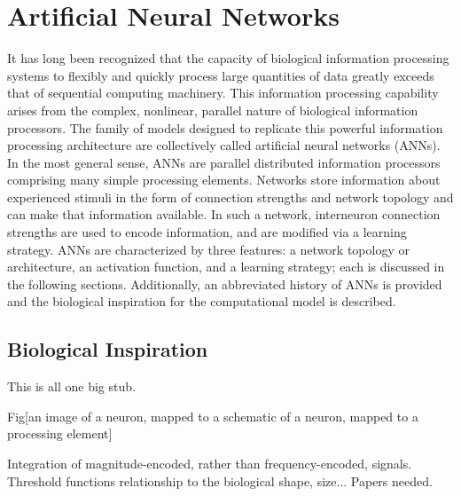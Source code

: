 \documentclass[11pt]{afthesis}
\begin{document}
	\section{Artificial Neural Networks}
	
	
	
	It has long been recognized that the capacity of biological information processing systems to flexibly and quickly process large quantities of data greatly exceeds that of sequential computing machinery. This information processing capability arises from the complex, nonlinear, parallel nature of biological information processors. The family of models designed to replicate this powerful information processing architecture are collectively called artificial neural networks (ANNs). In the most general sense, ANNs are parallel distributed information processors \cite{haykin1999} comprising many simple processing elements. Networks store information about experienced stimuli in the form of connection strengths and network topology and can make that information available. In such a network, interneuron connection strengths are used to encode information, and are modified via a learning strategy. ANNs are characterized by three features: a network topology or architecture, an activation function, and a learning strategy; each is discussed in the following sections. Additionally, an abbreviated history of ANNs is provided and the biological inspiration for the computational model is described.
	
	\subsection{Biological Inspiration}
	
	This is all one big stub.
	
	Fig[an image of a neuron, mapped to a schematic of a neuron, mapped to a processing element]
	
	Integration of magnitude-encoded, rather than frequency-encoded, signals. 
	Threshold functions relationship to the biological shape, size... Papers needed.
	
\end{document}
